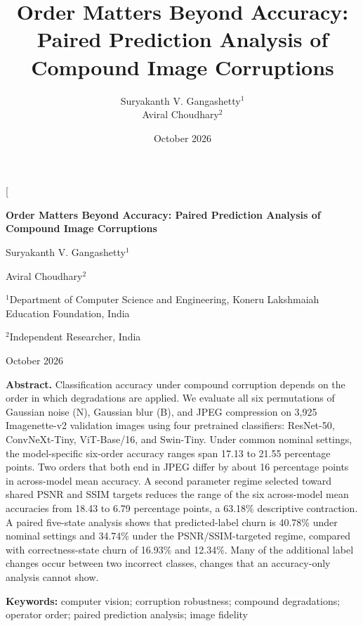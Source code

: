 \documentclass[10pt,twocolumn]{article}
\title{Order Matters Beyond Accuracy: Paired Prediction Analysis of
Compound Image Corruptions}
\author{Suryakanth V. Gangashetty$^{1}$\\[3pt] Aviral Choudhary$^{2}$}
\date{October 2026}
\begin{document}
\twocolumn[
\begin{@twocolumnfalse}
\vspace*{-0.45em}
\begin{center}
{\LARGE\bfseries Order Matters Beyond Accuracy: Paired Prediction Analysis of Compound Image Corruptions\par}
\vspace{0.65em}
{\large Suryakanth V. Gangashetty$^{1}$\par}
\vspace{0.14em}
{\large Aviral Choudhary$^{2}$\par}
\vspace{0.24em}
{\footnotesize $^{1}$Department of Computer Science and Engineering, Koneru Lakshmaiah Education Foundation, India\par}
{\footnotesize $^{2}$Independent Researcher, India\par}
\vspace{0.32em}
{\small October 2026\par}
\end{center}
\vspace{0.45em}
{\small\noindent\textbf{Abstract.} Classification accuracy under compound corruption depends on the order
in which degradations are applied. We evaluate all six permutations of
Gaussian noise (N), Gaussian blur (B), and JPEG compression on 3,925
Imagenette-v2 validation images using four pretrained classifiers:
ResNet-50, ConvNeXt-Tiny, ViT-Base/16, and Swin-Tiny. Under common
nominal settings, the model-specific six-order accuracy ranges span
17.13 to 21.55 percentage points. Two orders that both end in JPEG
differ by about 16 percentage points in across-model mean accuracy. A
second parameter regime selected toward shared PSNR and SSIM targets
reduces the range of the six across-model mean accuracies from 18.43 to
6.79 percentage points, a 63.18\% descriptive contraction. A paired
five-state analysis shows that predicted-label churn is 40.78\% under
nominal settings and 34.74\% under the PSNR/SSIM-targeted regime,
compared with correctness-state churn of 16.93\% and 12.34\%. Many of
the additional label changes occur between two incorrect classes,
changes that an accuracy-only analysis cannot show.
\par\vspace{0.35em}}
{\small\noindent\textbf{Keywords:} computer vision; corruption robustness; compound
degradations; operator order; paired prediction analysis; image fidelity}
\vspace{0.6em}
\begin{tcolorbox}

\end{tcolorbox}
\end{@twocolumnfalse}
\end{document}
